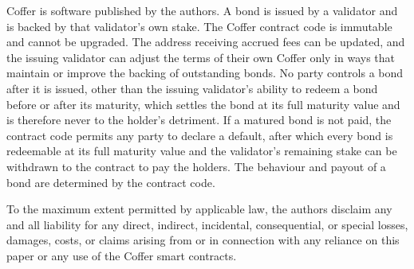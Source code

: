 \documentclass{article}
\begin{document}
Coffer is software published by the authors. A bond is issued by a validator and is backed by that validator's own stake. The Coffer contract code is immutable and cannot be upgraded. The address receiving accrued fees can be updated, and the issuing validator can adjust the terms of their own Coffer only in ways that maintain or improve the backing of outstanding bonds. No party controls a bond after it is issued, other than the issuing validator's ability to redeem a bond before or after its maturity, which settles the bond at its full maturity value and is therefore never to the holder's detriment. If a matured bond is not paid, the contract code permits any party to declare a default, after which every bond is redeemable at its full maturity value and the validator's remaining stake can be withdrawn to the contract to pay the holders. The behaviour and payout of a bond are determined by the contract code.

To the maximum extent permitted by applicable law, the authors disclaim any and all liability for any direct, indirect, incidental, consequential, or special losses, damages, costs, or claims arising from or in connection with any reliance on this paper or any use of the Coffer smart contracts.
\end{document}
